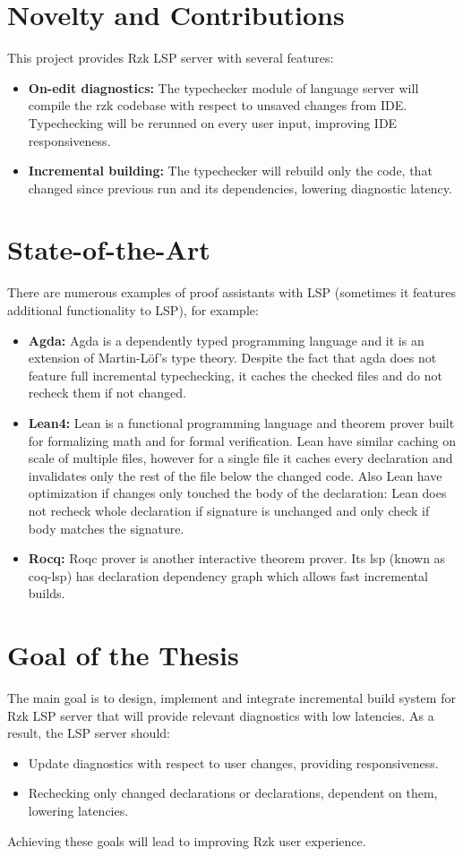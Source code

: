 \documentclass[12pt, a4paper]{article}
\begin{document}
\section{Novelty and Contributions}
This project provides Rzk LSP server with several features:
\begin{itemize}
    \item \textbf{On-edit diagnostics:} The typechecker module of language server will compile the rzk codebase with respect to unsaved changes from IDE. Typechecking will be rerunned on every user input, improving IDE responsiveness.
    \item \textbf{Incremental building:} The typechecker will rebuild only the code, that changed since previous run and its dependencies, lowering diagnostic latency.
\end{itemize}

\section{State-of-the-Art}
There are numerous examples of proof assistants with LSP (sometimes it features additional functionality to LSP), for example:
\begin{itemize}
    \item \textbf{Agda:} Agda is a dependently typed programming language and it is an extension of Martin-Löf’s type theory. Despite the fact that agda does not feature full incremental typechecking, it caches the checked files and do not recheck them if not changed.
    \item \textbf{Lean4:} Lean is a functional programming language and theorem prover built for formalizing math and for formal verification. Lean have similar caching on scale of multiple files, however for a single file it caches every declaration and invalidates only the rest of the file below the changed code. Also Lean have optimization if changes only touched the body of the declaration: Lean does not recheck whole declaration if signature is unchanged and only check if body matches the signature.
    \item \textbf{Rocq:} Roqc prover is another interactive theorem prover. Its lsp (known as coq-lsp) has declaration dependency graph which allows fast incremental builds.
\end{itemize}

\section{Goal of the Thesis}
The main goal is to design, implement and integrate incremental build system for Rzk LSP server that will provide relevant diagnostics with low latencies. As a result, the LSP server should:
\begin{itemize}
    \item Update diagnostics with respect to user changes, providing responsiveness.
    \item Rechecking only changed declarations or declarations, dependent on them, lowering latencies.
\end{itemize}
Achieving these goals will lead to improving Rzk user experience.
\end{document}

